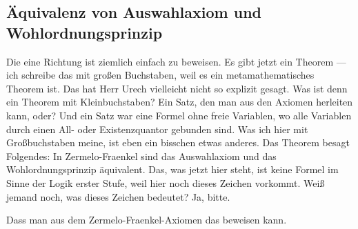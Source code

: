 \subsection{Äquivalenz von Auswahlaxiom und Wohlordnungsprinzip}

\begin{spoken-clean}[00:26:30 - 00:28:30]
Die eine Richtung ist ziemlich einfach zu beweisen. Es gibt jetzt ein Theorem --- ich schreibe das mit großen Buchstaben, weil es ein metamathematisches Theorem ist. Das hat Herr Urech vielleicht nicht so explizit gesagt. Was ist denn ein Theorem mit Kleinbuchstaben? Ein Satz, den man aus den Axiomen herleiten kann, oder? Und ein Satz war eine Formel ohne freie Variablen, wo alle Variablen durch einen All- oder Existenzquantor gebunden sind. Was ich hier mit Großbuchstaben meine, ist eben ein bisschen etwas anderes. Das Theorem besagt Folgendes: In Zermelo-Fraenkel sind das Auswahlaxiom und das Wohlordnungsprinzip äquivalent. Das, was jetzt hier steht, ist keine Formel im Sinne der Logik erster Stufe, weil hier noch dieses Zeichen vorkommt. Weiß jemand noch, was dieses Zeichen bedeutet? Ja, bitte.
\end{spoken-clean}

\begin{student-interaction}[Studentenantwort]
Dass man aus dem Zermelo-Fraenkel-Axiomen das beweisen kann.
\end{student-interaction}

